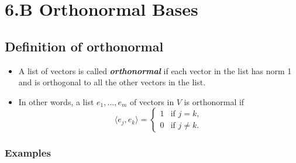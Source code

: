 \documentclass[11pt]{article}
\begin{document}
    \pagebreak

    \section{6.B Orthonormal Bases}

    \subsection{Definition of orthonormal}

    \begin{itemize}
        \item A list of vectors is called \textbf{\emph{orthonormal}} if each vector in the list has norm 1 and is orthogonal to all the other vectors in the list.
        \item In other words, a list \(e_1, \dots, e_m\) of vectors in $V$ is orthonormal if 
        \begin{equation*}
            \langle e_j, e_k \rangle = \begin{cases}
                1 & \text{if } j = k, \\
                0 & \text{if } j \neq k.
            \end{cases}
        \end{equation*}
    \end{itemize}

    \subsubsection{Examples}
\end{document}
